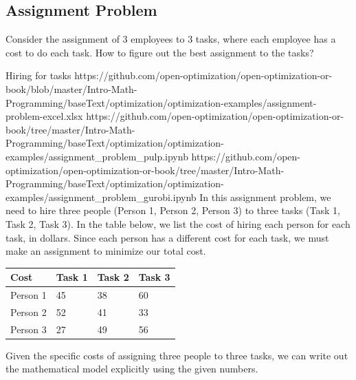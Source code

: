 \subsection{Assignment Problem}
Consider the assignment of $3$ employees to $3$ tasks, where each employee has a cost to do each task.  How to figure out the best assignment to the tasks?

\begin{examplewithallcode}
{Hiring for tasks}
{https://github.com/open-optimization/open-optimization-or-book/blob/master/Intro-Math-Programming/baseText/optimization/optimization-examples/assignment-problem-excel.xlsx}
{https://github.com/open-optimization/open-optimization-or-book/tree/master/Intro-Math-Programming/baseText/optimization/optimization-examples/assignment_problem_pulp.ipynb}
{https://github.com/open-optimization/open-optimization-or-book/tree/master/Intro-Math-Programming/baseText/optimization/optimization-examples/assignment_problem_gurobi.ipynb}
\label{example:hiring-for-tasks}
In this assignment problem, we need to hire three people (Person 1, Person 2, Person 3) to three tasks (Task 1, Task 2, Task 3).   In the table below, we list the cost of hiring each person for each task, in dollars.  Since each person has a different cost for each task, we must make an assignment to minimize our total cost.

\medskip
\noindent
\begin{center}
\begin{tabular}{llll}
    \hline
        Cost & Task 1 & Task 2 & Task 3  \\ \hline
        Person 1 & 45 & 38 & 60  \\ \hline
        Person 2 & 52 & 41 & 33  \\ \hline
        Person 3 & 27 & 49 & 56 \\ \hline
    \end{tabular}
\par{}\label{tab:modeling-linear-programming-tab06}%

\end{center}

Given the specific costs of assigning three people to three tasks, we can write out the mathematical model explicitly using the given numbers.
\end{examplewithallcode}
